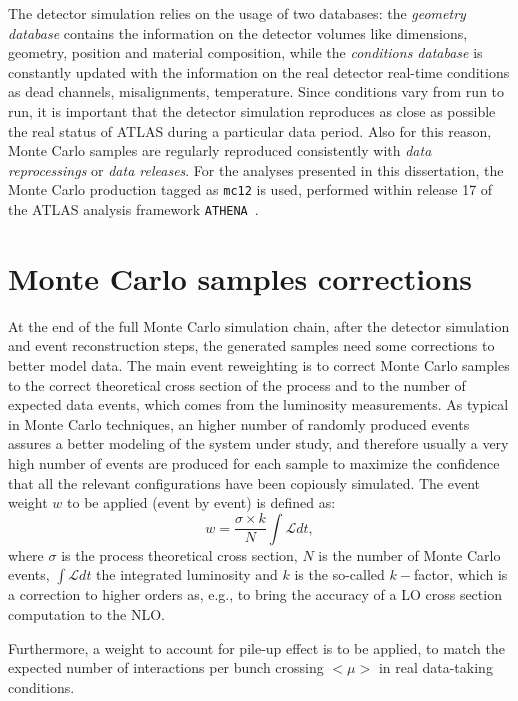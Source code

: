 The detector simulation relies on the usage of two databases: the 
{\it geometry database} contains the information on the detector volumes
like dimensions, geometry, position and material composition, while
the {\it conditions database} is constantly updated with the information
on the real detector real-time conditions as dead channels, misalignments,
temperature. Since conditions vary from run to run, it is important that
the detector simulation reproduces as close as possible the real status
of ATLAS during a particular data period. Also for this reason, Monte
Carlo samples are regularly reproduced consistently with {\it data reprocessings}
or {\it data releases}.  For the analyses presented in this dissertation,
the Monte Carlo production tagged as \texttt{mc12} is used, performed
within release 17 of the ATLAS analysis framework \texttt{ATHENA}~\cite{athena}.



\section{Monte Carlo samples corrections}\label{sec:mcweights}

At the end of the full Monte Carlo simulation chain, after the detector simulation
and event reconstruction steps, the generated samples need some corrections to
better model data. The main event reweighting is to correct Monte Carlo samples to
the correct theoretical cross section of the process and to the number of expected
data events, which comes from the luminosity measurements. As typical in Monte
Carlo techniques, an higher number of randomly produced events assures a better modeling
of the system under study, and therefore usually a very high number of events are
produced for each sample to maximize the confidence that all the relevant configurations
have been copiously simulated. The event weight $w$ to be applied (event by event) is defined
as:
\begin{equation}\label{eq:mcweight}
w = \dfrac{\sigma\times k}{N}\int \mathcal L dt,
\end{equation}
where $\sigma$ is the process theoretical cross section, $N$ is the number of Monte
Carlo events, $\int \mathcal L dt$ the integrated luminosity and $k$ is the so-called
$k-$factor, which is a correction to higher orders as, e.g., to bring the accuracy
of a LO cross section computation to the NLO.

Furthermore, a weight to account for pile-up effect is to be applied, to match the
expected number of interactions per bunch crossing $<\mu>$ in real data-taking conditions. 
